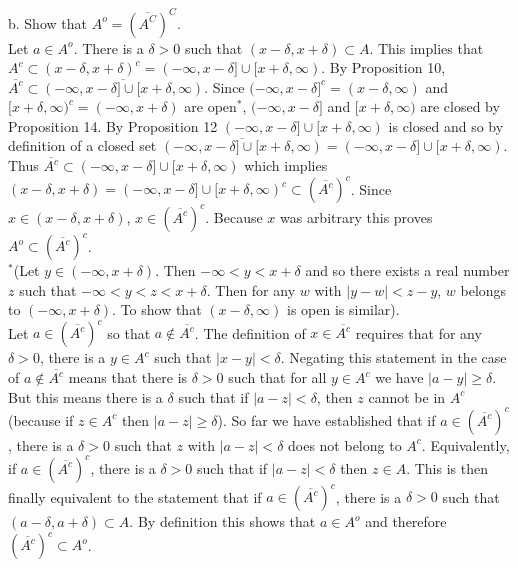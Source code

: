 \documentclass[a4paper]{article}
\begin{document}
b. Show that $A^o = \left(\overline{A^C}\right)^C$.\\

Let $a \in A^o$. There is a $\delta > 0 $ such that $(x-\delta,x+\delta) \subset A$. This implies that $A^c \subset (x-\delta,x+\delta)^c = (-\infty,x-\delta]\cup[x+\delta,\infty)$. By Proposition 10, $\overline{A^c} \subset \overline{(-\infty,x-\delta]\cup[x+\delta,\infty)}$. Since $(-\infty,x-\delta]^c = (x-\delta, \infty)$ and $[x+\delta,\infty)^c = (-\infty,x+\delta)$ are open$^*$, $(-\infty,x-\delta]$ and $[x+\delta,\infty)$ are closed by Proposition 14. By Proposition 12 $(-\infty,x-\delta]\cup[x+\delta,\infty)$ is closed and so by definition of a closed set $\overline{(-\infty,x-\delta]\cup[x+\delta,\infty)} = (-\infty,x-\delta]\cup[x+\delta,\infty)$. Thus $\overline{A^c} \subset (-\infty,x-\delta]\cup[x+\delta,\infty)$ which implies $(x-\delta,x+\delta)=(-\infty,x-\delta]\cup[x+\delta,\infty)^c \subset \left(\overline{A^c}\right)^c$. Since $x \in (x-\delta,x+\delta)$, $x \in \left(\overline{A^c}\right)^c$. Because $x$ was arbitrary this proves $A^o \subset \left(\overline{A^c}\right)^c$. \\

$^*$(Let $y \in (-\infty, x+ \delta)$. Then $-\infty < y<x+\delta$ and so there exists a real number $z$ such that $-\infty <y<z<x+\delta$. Then for any $w$ with $|y-w|<z-y$, $w$ belongs to $(-\infty,x+\delta)$. To show that $(x-\delta, \infty)$ is open is similar). \\

Let $a \in \left(\overline{A^c}\right)^c$ so that $a \not\in \overline{A^c}$. The definition of $x \in \overline{A^c}$ requires that for any $\delta>0$, there is a $y \in A^c$ such that $|x-y|<\delta$. Negating this statement in the case of $a \not\in \overline{A^c}$ means that there is $\delta > 0$ such that for all $y \in A^c$ we have $|a-y| \geq \delta$. But this means there is a $\delta$ such that if $|a-z|<\delta$, then $z$ cannot be in $A^c$ (because if $z \in A^c$ then $|a-z|\geq \delta$). So far we have established that if $a \in  \left(\overline{A^c}\right)^c$, there is a $\delta>0$ such that $z$ with $|a-z| < \delta$ does not belong to $A^c$. Equivalently, if $a \in  \left(\overline{A^c}\right)^c$, there is a $\delta>0$ such that if $|a-z| < \delta$ then $z \in A$. This is then finally equivalent to the statement that if $a \in  \left(\overline{A^c}\right)^c$, there is a $\delta>0$ such that $(a-\delta,a+\delta) \subset A$. By definition this shows that $a \in A^o$ and therefore $\left(\overline{A^c}\right)^c\subset A^o$. \\
\end{document}
